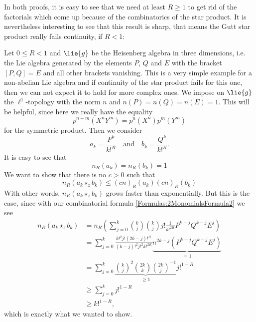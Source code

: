 In both proofs, it is easy to see that we need at least $R \geq 1$ to
get rid of the factorials which come up because of the combinatorics
of the star product. It is nevertheless interesting to see that this
result is sharp, that means the Gutt star product really fails
continuity, if $R < 1$:
\begin{example}
    \label{Ex:LCAna:HeisenbergAlgebra}%
    Let $0 \leq R < 1$ and $\lie{g}$ be the Heisenberg algebra in three 
    dimensions, i.e. the Lie algebra generated by the elements 
    $P$, $Q$ and $E$ with the bracket $[P,Q] = E$ and all other brackets
    vanishing. This is a very simple example for a non-abelian Lie algebra
    and if continuity of the star product fails for this one, then we
    can not expect it to hold for more complex ones. We impose on
    $\lie{g}$ the $\ell^1$-topology with the norm $n$ and $n(P) = n(Q)
    = n(E) = 1$. This will be helpful, since here we really have the equality
    \begin{equation*}
    		p^{n+m} \left( X^n Y^m \right)
    		=
    		p^n \left( X^n \right)
    		p^m \left( Y^m \right)
    \end{equation*}
    for the symmetric product. Then we consider
    \begin{equation*}
        a_k
        =
        \frac{P^k}{k!^R}
        \quad
        \textrm{and}
        \quad
        b_k
        =
        \frac{Q^k}{k!^R}.
    \end{equation*}
    It is easy to see that
    \begin{equation*}
        n_R(a_k)
        =
        n_R(b_k)
        =
        1
    \end{equation*}
    We want to show that there is no $c > 0$ such that
    \begin{equation*}
        n_R(a_k \star_z b_k)
        \leq
        (c n)_R(a_k) (c n)_R(b_k)
    \end{equation*}
    With other words, $n_R(a_k \star_z b_k)$ grows faster than
    exponentially. But this is the case, since with our combinatorial
    formula \eqref{Formulas:2MonomialsFormula2} we see
    \begin{align*}
        n_R(a_k \star_z b_k)
        & =
        n_R \left(
        \sum\limits_{j=0}^k
        \binom{k}{j}
        \binom{k}{j}
        j! \frac{1}{k!^{2R}}
        P^{k-j} Q^{k-j} E^j
        \right)
        \\
        & =
        \sum\limits_{j=0}^k
        \frac{k!^2 j! (2k - j)!^R}{(k-j)!^2 j!^2 k!^{2R}}
        \underbrace{
        n^{2k-j}
        ( P^{k-j} Q^{k-j} E^j )
        }_{= 1}
        \\
        & =
        \sum\limits_{j=0}^k
        \underbrace{
        \binom{k}{j}^2 \binom{2k}{k} \binom{2k}{j}^{-1}
        }_{\geq 1}
        j!^{1-R}
        \\
        & \geq
        \sum\limits_{j=0}^k
        j!^{1-R}
        \\
        & \geq
        k!^{1-R},
    \end{align*}
    which is exactly what we wanted to show.
\end{example}



